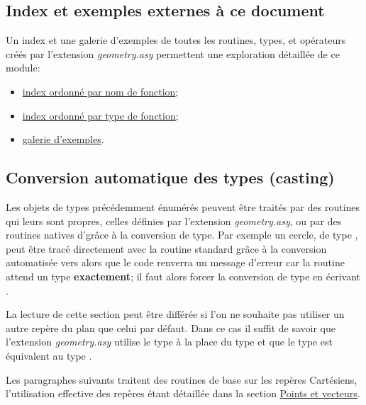 \documentclass[pdftex]{article}
\newcommand{\geo}{l'extension \emph{geometry.asy}\xspace}
\begin{document}
\subsection{Index et exemples externes à ce document}
Un index et une galerie d'exemples de toutes les routines, types, et
opérateurs créés par \geo permettent une exploration détaillée de ce module:
\begin{itemize}
\item \href{http://piprim.tuxfamily.org/asymptote/geometry/modules/geometry.asy.index.sign.html}{index ordonné par nom de fonction};
\item \href{http://piprim.tuxfamily.org/asymptote/geometry/modules/geometry.asy.index.type.html}{index ordonné par type de fonction};
\item \href{http://piprim.tuxfamily.org/asymptote/geometry/index.html}{galerie d'exemples}.
\end{itemize}

\subsection{Conversion automatique des types (\og{}casting\fg{})}
Les objets de types précédemment énumérés peuvent être traités par des routines
qui leurs sont propres, celles définies par \geo, ou par des routines
natives d'\asymptote grâce à la conversion de type. Par exemple un cercle, de type
, peut être tracé directement avec la routine standard
 grâce à la conversion automatisée  vers  alors
que le code  renverra un message d'erreur car
la routine  attend un type  \textbf{exactement}; il faut
alors forcer la conversion de type en écrivant .

La lecture de cette section peut être différée si l'on ne souhaite pas
utiliser un autre repère du plan que celui par défaut. Dans ce cas
il suffit de savoir que \geo utilise le type  à la place
du type  et que le type  est équivalent au
type .

Les paragraphes suivants traitent des routines de base sur les
repères Cartésiens, l'utilisation effective des repères étant détaillée
dans la section \href{#section.point}{Points et vecteurs}.
\end{document}
